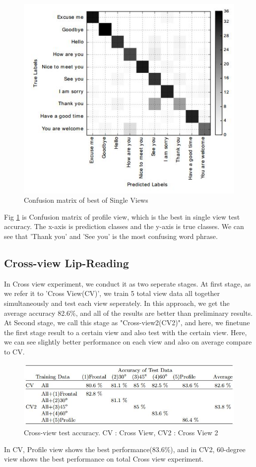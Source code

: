 \begin{figure}[h]
	\centering
	\includegraphics[width=\columnwidth]{fig/s2.jpg}
	\caption{Confusion matrix of best of Single Views}
	\label{fig:s2}
\end{figure}
Fig \ref{fig:s2} is Confusion matrix of profile view, which is the best in single view test accuracy. The x-axis is prediction classes and the y-axis is true classes.
We can see that 'Thank you' and 'See you' is the most confusing word phrase.


\subsection{Cross-view Lip-Reading}
In Cross view experiment, we conduct it as two seperate stages. At first stage, as we refer it to 'Cross View(CV)', we train 5 total view data all together simultaneously and test each view seperately.  In this approach, we get the
average accuracy 82.6\%, and all of the results are better than preliminary results.
 At Second stage, we call this stage as "Cross-view2(CV2)", and here, we finetune the first stage result to a certain view and also test with the certain view. Here, we can see slightly better performance on each view and also on average compare to CV.
  
\begin{figure}[h]
	\centering
	\includegraphics[width=\columnwidth]{fig/c1.jpg}
	\caption{Cross-view test accuracy. CV : Cross View, CV2 : Cross View 2}
	\label{fig:c1}
\end{figure}
In CV, Profile view shows the best performance(83.6\%), and in CV2, 60-degree view shows the best performance on total Cross view experiment.

